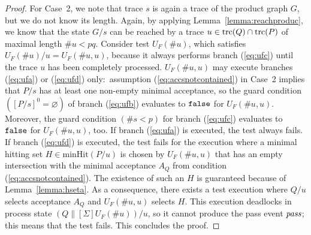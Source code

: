 \begin{proof}
For   Case~2, we note that trace $s$ is again a trace of the product graph
$G$, but we do not know its length. Again, by applying Lemma~\ref{lemma:reachproduc},
we know that the state   $G/s$ can   be reached by a trace
$u\in\text{trc}(Q)\cap\text{trc}(P)$ of maximal length $\#u < pq$. Consider test $U_F(\#
u)$, which satisfies $U_F(\# u)/u = U_F(\#u,u)$, because it always performs
branch (\ref{eq:ufc}) until the trace $u$ has been completely processed.
$U_F(\#u,u)$ may execute branches (\ref{eq:ufa}) or (\ref{eq:ufd})
only:~assumption (\ref{eq:accsnotcontained}) in Case~2 implies that $P/s$ has
at least one non-empty minimal acceptance, so the guard condition $([P/s]^0 =
\varnothing)$ of branch (\ref{eq:ufb}) evaluates to $\mbox{{\tt false}}$ for $U_F(\#u,u)$.
Moreover, the guard condition $(\#s < p)$ for branch (\ref{eq:ufc}) evaluates
to $\mbox{{\tt false}}$ for $U_F(\#u,u)$, too. If branch (\ref{eq:ufa}) is executed, the
test always fails. If branch (\ref{eq:ufd}) is executed, the test fails for
the execution where a minimal hitting set $H\in\text{minHit}(P/u)$ is chosen
by $U_F(\#u,u)$ that has an empty intersection with the minimal acceptance
$A_Q$ from condition (\ref{eq:accsnotcontained}). The existence of such an
$H$ is guaranteed because of Lemma~\ref{lemma:hseta}. As a consequence, there
exists a test execution   where $Q/u$ selects acceptance $A_Q$ and
$U_F(\#u,u)$ selects $H$. This execution deadlocks in process state
$(Q\parallel[\Sigma]U_F(\# u))/u$, so it cannot produce the pass event
${\text{\it pass}}$; this  means that the test fails. This concludes the proof. \xbox
\end{proof}


















